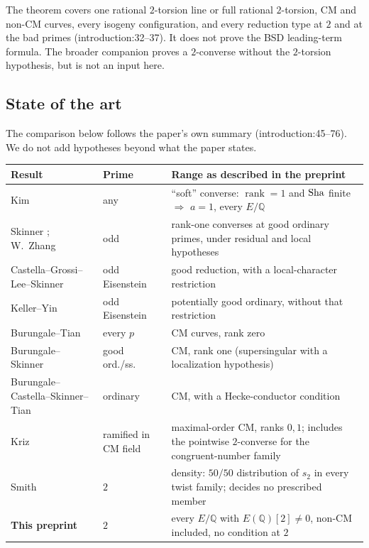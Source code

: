 \documentclass[11pt]{article}
\theoremstyle{remark}
\newcommand{\Q}{\mathbb Q}
\newcommand{\Sha}{\text{\rm Sha}}
\DeclareMathOperator{\rank}{rank}
\newcommand{\src}[2]{\textsf{\small #1:#2}}
\begin{document}
The theorem covers one rational $2$-torsion line or full rational
$2$-torsion, CM and non-CM curves, every isogeny configuration, and every
reduction type at $2$ and at the bad primes (\src{introduction}{32--37}).
It does not prove the BSD leading-term formula. The broader companion
\cite{OAIGoldfeld} proves a $2$-converse without the $2$-torsion hypothesis,
but is not an input here.

\subsection{State of the art}
The comparison below follows the paper's own summary
(\src{introduction}{45--76}). We do not add hypotheses beyond what the
paper states.

\begin{center}\small
\begin{tabular}{@{}P{0.27\textwidth}P{0.11\textwidth}P{0.55\textwidth}@{}}
\toprule
Result & Prime & Range as described in the preprint \\
\midrule
Kim \cite{Kim2023SoftConverse} & any & ``soft'' converse: $\rank=1$ and $\Sha$ finite $\Rightarrow$ $a=1$, every $E/\Q$ \\
Skinner \cite{Skinner2020}; W.~Zhang \cite{Zhang2014Heegner} & odd & rank-one converses at good ordinary primes, under residual and local hypotheses \\
Castella--Grossi--Lee--Skinner \cite[Thm.~E]{CGLS2022} & odd Eisenstein & good reduction, with a local-character restriction \\
Keller--Yin \cite[Thm.~B]{KellerYin2024} & odd Eisenstein & potentially good ordinary, without that restriction \\
Burungale--Tian \cite{BurungaleTian2026} & every $p$ & CM curves, rank zero \\
Burungale--Skinner \cite[Thms.~A.1, A.3]{BurungaleSkinner2024Appendix} & good ord./ss.\ & CM, rank one (supersingular with a localization hypothesis) \\
Burungale--Castella--Skinner--Tian \cite{BurungaleCastellaSkinnerTian2022} & ordinary & CM, with a Hecke-conductor condition \\
Kriz \cite[Thms.~1.1, 10.17(2)]{Kriz2022CM} & ramified in CM field & maximal-order CM, ranks $0,1$; includes the pointwise $2$-converse for the congruent-number family \\
Smith \cite{Smith2025} & $2$ & density: $50/50$ distribution of $s_2$ in every twist family; decides no prescribed member \\
\midrule
\textbf{This preprint} & $2$ & every $E/\Q$ with $E(\Q)[2]\ne0$, non-CM included, no condition at $2$ \\
\bottomrule
\end{tabular}
\end{center}
\end{document}
